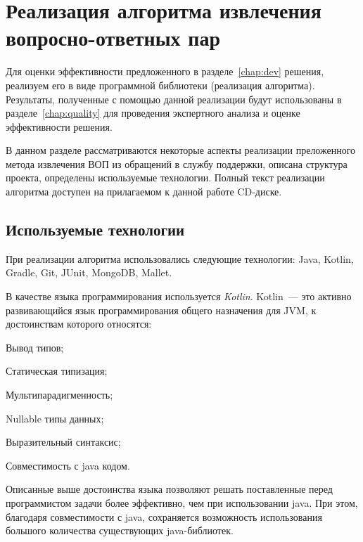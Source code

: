 \chapter{Реализация алгоритма извлечения вопросно-ответных пар}
\label{chap:impl}

Для оценки эффективности предложенного в разделе~\ref{chap:dev} решения, реализуем его в виде программной библиотеки (реализация алгоритма). Результаты, полученные с помощью данной реализации будут использованы в разделе~\ref{chap:quality} для проведения экспертного анализа и оценке эффективности решения.

В данном разделе рассматриваются некоторые аспекты реализации преложенного метода извлечения ВОП из обращений в службу поддержки, описана структура проекта, определены используемые технологии. Полный текст реализации алгоритма доступен на прилагаемом к данной работе CD-диске.

\section{Используемые технологии}
При реализации алгоритма использовались следующие технологии: Java, Kotlin, Gradle, Git, JUnit, MongoDB, Mallet.

В качестве языка программирования используется \textit{Kotlin}. Kotlin~--- это активно развивающийся язык программирования общего назначения для JVM, к достоинствам которого относятся:


\begin{itemize*}
\item Вывод типов;
\item Статическая типизация;
\item Мультипарадигменность;
\item Nullable типы данных;
\item Выразительный синтаксис;
\item Совместимость с java кодом.
\end{itemize*}

Описанные выше достоинства языка позволяют решать поставленные перед программистом задачи более эффективно, чем при использовании java. При этом, благодаря совместимости с java, сохраняется возможность использования большого количества существующих java-библиотек.

